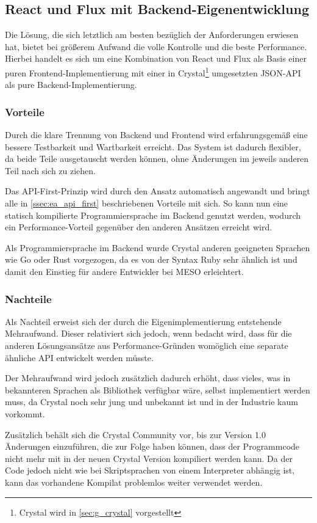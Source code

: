 \subsection{React und Flux mit Backend-Eigenentwicklung}
\label{ssec:el_react_und_flux_mit_backend_eigenentwicklung}

Die Lösung, die sich letztlich am besten bezüglich der Anforderungen erwiesen
hat, bietet bei größerem Aufwand die volle Kontrolle und die beste Performance.
Hierbei handelt es sich um eine Kombination von React und Flux als Basis einer
puren Frontend-Implementierung mit einer in Crystal\footnote{Crystal wird in
\cref{sec:g_crystal} vorgestellt} umgesetzten JSON-API als pure
Backend-Implementierung.

\subsubsection{Vorteile}
\label{sssec:ele_vorteile}

Durch die klare Trennung von Backend und Frontend wird erfahrungsgemäß eine
bessere Testbarkeit und Wartbarkeit erreicht.  Das System ist dadurch
flexibler, da beide Teile ausgetauscht werden können, ohne Änderungen im
jeweils anderen Teil nach sich zu ziehen.

Das API-First-Prinzip wird durch den Ansatz automatisch angewandt und bringt
alle in \cref{ssec:ea_api_first} beschriebenen Vorteile mit sich.  So kann nun
eine statisch kompilierte Programmiersprache im Backend genutzt werden, wodurch
ein Performance-Vorteil gegenüber den anderen Ansätzen erreicht wird.

Als Programmiersprache im Backend wurde Crystal anderen geeigneten Sprachen wie
Go oder Rust vorgezogen, da es von der Syntax Ruby sehr ähnlich ist und damit
den Einstieg für andere Entwickler bei MESO erleichtert.

\subsubsection{Nachteile}
\label{sssec:ele_nachteile}

Als Nachteil erweist sich der durch die Eigenimplementierung entstehende
Mehraufwand.  Dieser relativiert sich jedoch, wenn bedacht wird, dass für die
anderen Lösungsansätze aus Performance-Gründen womöglich eine separate ähnliche
API entwickelt werden müsste.

Der Mehraufwand wird jedoch zusätzlich dadurch erhöht, dass vieles, was in
bekannteren Sprachen als Bibliothek verfügbar wäre, selbst implementiert werden
muss, da Crystal noch sehr jung und unbekannt ist und in der Industrie kaum
vorkommt.

Zusätzlich behält sich die Crystal Community vor, bis zur Version 1.0
Änderungen einzuführen, die zur Folge haben können, dass der Programmcode nicht
mehr mit in der neuen Crystal Version kompiliert werden kann.  Da der Code
jedoch nicht wie bei Skriptsprachen von einem Interpreter abhängig ist, kann
das vorhandene Kompilat problemlos weiter verwendet werden.
